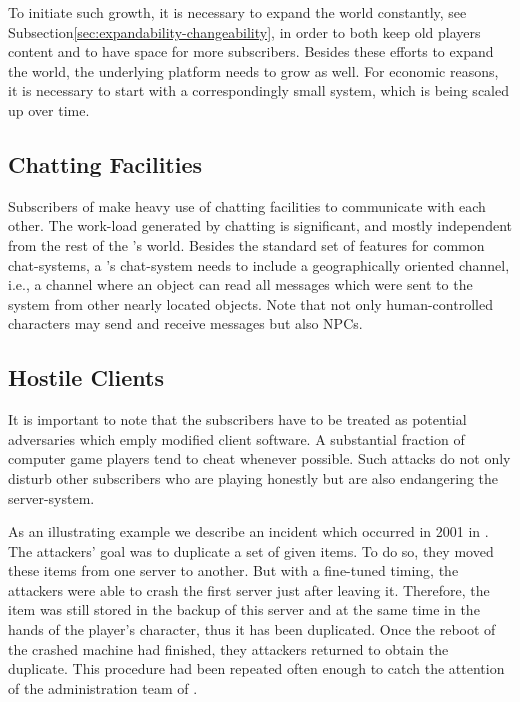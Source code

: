 \documentclass[a4paper, 10pt]{book}
\begin{document}
To initiate such growth, it is necessary to expand the world
constantly, see Subsection\vref{sec:expandability-changeability}, in order
to both
keep old players content and to have space for more subscribers.
Besides these efforts to expand the world, the underlying platform
needs to grow as well.
%
For economic reasons, it is necessary to start with a correspondingly
small system, which is being scaled up over time. 
%

\subsection{Chatting Facilities}

Subscribers of \MMORGS make heavy use of chatting facilities to
communicate with each other. The
work-load generated by chatting is significant, and mostly
independent from the rest of the \MMORG's world. Besides the standard
set of features for common chat-systems, a \MMORG's chat-system needs
to include a geographically oriented channel, i.e., a channel where an
object can read all messages which were sent to the system from other
nearly located objects.
%
Note that not only human-controlled characters may send and receive
messages but also NPCs.


\subsection{Hostile Clients} 
\label{sec:players-are-potential-adversaries}

It is important to note that the subscribers have to be treated as potential
adversaries which emply modified client software. A substantial  fraction of
computer game players tend to cheat whenever possible. Such attacks do not only
disturb other subscribers who are playing honestly but are also endangering the
server-system.

As an illustrating example we describe an incident which occurred
in 2001 in \ASHERON. The attackers'
goal was to duplicate a set of given items. To do so, they moved these
items from one server to another. But with a fine-tuned timing, the
attackers were able to crash the first server just after leaving it.
Therefore, the item was still stored in the backup of this server and
at the same time in the hands of the player's character, thus it has
been duplicated. Once the reboot of the crashed machine had finished,
they attackers returned to obtain the duplicate. This procedure had
been repeated often enough to catch the attention 
of the administration team of \ASHERON.
\end{document}
